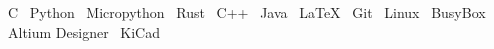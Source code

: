 
\raggedright{
  \textbullet{}~C
  \textbullet{}~Python
  \textbullet{}~Micropython
  \textbullet{}~Rust
  \textbullet{}~C++
  \textbullet{}~Java
  \textbullet{}~\LaTeX
  \textbullet{}~Git
  \textbullet{}~Linux
  \textbullet{}~BusyBox
  \textbullet{}~Altium Designer
  \textbullet{}~KiCad
}
